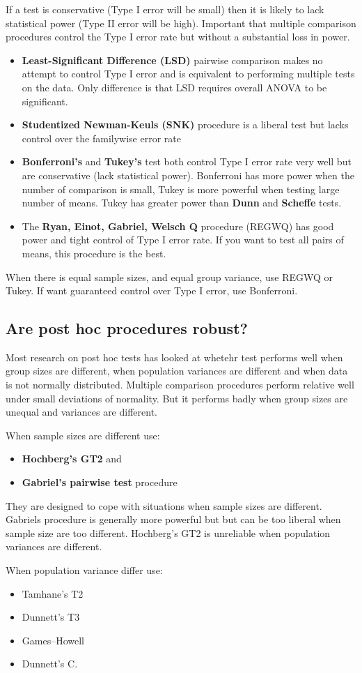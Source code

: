 If a test is conservative (Type I error will be small) then it is likely to lack statistical power (Type II error will be high). Important that multiple comparison procedures control the Type I error rate but without a substantial loss in power. 

\begin{itemize}
\item \textbf{Least-Significant Difference (LSD)} pairwise comparison makes no attempt to control Type I error and is equivalent to performing multiple tests on the data. Only difference is that LSD requires overall ANOVA to be significant.
\item \textbf{Studentized Newman-Keuls (SNK)} procedure is a liberal test but lacks control over the familywise error rate
\item \textbf{Bonferroni's} and \textbf{Tukey's} test both control Type I error rate very well but are conservative (lack statistical power). Bonferroni has more power when the number of comparison is small, Tukey is more powerful when testing large number of means. Tukey has greater power than \textbf{Dunn} and \textbf{Scheffe} tests.
\item The \textbf{Ryan, Einot, Gabriel, Welsch Q} procedure (REGWQ) has good power and tight control of Type I error rate. If you want to test all pairs of means, this procedure is the best. 
\end{itemize}

When there is equal sample sizes, and equal group variance, use REGWQ or Tukey. If want guaranteed control over Type I error, use Bonferroni.

\subsection{Are post hoc procedures robust?}
Most research on post hoc tests has looked at whetehr test performs well when group sizes are different, when population variances are different and when data is not normally distributed. Multiple comparison procedures perform relative well under small deviations of normality. But it performs badly when group sizes are unequal and variances are different. 

When sample sizes are different use: 
\begin {itemize}
\item \textbf{Hochberg's GT2} and 
\item \textbf{Gabriel's pairwise test} procedure 
\end{itemize} 
They are designed to cope with situations when sample sizes are different. Gabriels procedure is generally more powerful but but can be too liberal when sample size are too different.  Hochberg's GT2 is unreliable when population variances are different. 

When population variance differ use:
\begin{itemize}
\item Tamhane’s T2
\item Dunnett’s T3
\item Games–Howell 
\item Dunnett’s C. 
\end{itemize}